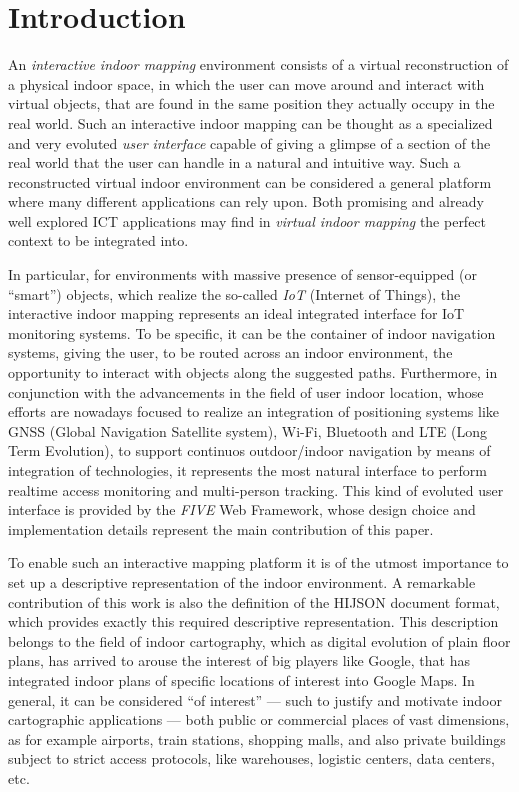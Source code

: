 \section{Introduction}\label{introduction}

An \emph{interactive indoor mapping} environment consists of a virtual reconstruction
of a physical indoor space, in which the user can move around and interact
with virtual objects, that are found in the same position they actually occupy in the
real world. Such an interactive indoor mapping can be thought as a specialized
and very evoluted \emph{user interface} capable of giving a glimpse of a section of
the real world that the user can handle in a natural and intuitive way. Such
a reconstructed virtual indoor environment can be considered a general
platform where many different applications can rely upon. Both promising and
already well explored ICT applications may find in \emph{virtual indoor mapping} the
perfect context to be integrated into.

In particular, for environments with massive presence of sensor-equipped (or
``smart'') objects, which realize the so-called \emph{IoT} (Internet of
Things), the interactive indoor mapping represents an ideal integrated
interface for IoT monitoring systems. To be specific, it can be the container
of indoor navigation systems, giving the user, to be routed across an indoor
environment, the opportunity to interact with objects along the suggested
paths. Furthermore, in conjunction with the advancements in the field of user
indoor location, whose efforts are nowadays focused to realize an integration
of positioning systems like GNSS (Global Navigation Satellite system), Wi-Fi,
Bluetooth and LTE (Long Term Evolution), to support continuos outdoor/indoor
navigation by means of integration of technologies, it represents the most
natural interface to perform realtime access monitoring and multi-person
tracking. This kind of evoluted user interface is provided by the \emph{FIVE}
Web Framework, whose design choice and implementation details represent the
main contribution of this paper.

To enable such an interactive mapping platform it is of the utmost importance
to set up  a descriptive representation of the indoor environment. A
remarkable contribution of this work is also the definition of the HIJSON
document format, which provides exactly this required descriptive
representation. This description belongs to  the field of indoor cartography,
which as digital evolution of plain floor plans, has arrived to arouse the
interest of big players like Google, that has integrated indoor plans of
specific locations of interest \cite{indoormaps} into Google Maps. In general,
it can be considered ``of interest'' --- such to justify and motivate indoor
cartographic applications --- both public or commercial places of vast
dimensions, as for example airports, train stations, shopping malls, and also
private buildings subject to strict access protocols, like warehouses,
logistic centers, data centers, etc.

